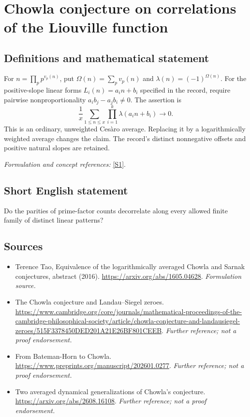\documentclass[11pt]{article}
\begin{document}
\section*{\texorpdfstring{Chowla conjecture on correlations of the Liouville function}{Chowla conjecture on correlations of the Liouville function}}\label{77}
\subsection{Definitions and mathematical statement}
For $n=\prod_p p^{v_p(n)}$, put $\Omega(n)=\sum_pv_p(n)$ and $\lambda(n)=(-1)^{\Omega(n)}$. For the positive-slope linear forms $L_i(n)=a_in+b_i$ specified in the record, require pairwise nonproportionality $a_ib_j-a_jb_i\ne0$. The assertion is
\[
 \frac1x\sum_{1\le n\le x}\prod_{i=1}^k\lambda(a_in+b_i)\longrightarrow0.
\]
This is an ordinary, unweighted Cesàro average. Replacing it by a logarithmically weighted average changes the claim. The record's distinct nonnegative offsets and positive natural slopes are retained.
\par\smallskip\textit{Formulation and concept references:} \href{https://arxiv.org/abs/1605.04628}{[S1]}.

\subsection{Short English statement}
Do the parities of prime-factor counts decorrelate along every allowed finite family of distinct linear patterns?
\subsection{Sources}
\begin{itemize}
\item[S1]Terence Tao, Equivalence of the logarithmically averaged Chowla and Sarnak conjectures, abstract (2016).
\url{https://arxiv.org/abs/1605.04628}.
\textit{Formulation source.}
\item[S2]The Chowla conjecture and Landau–Siegel zeroes.
\url{https://www.cambridge.org/core/journals/mathematical-proceedings-of-the-cambridge-philosophical-society/article/chowla-conjecture-and-landausiegel-zeroes/515F3378450DED201A21E26BF801CEEB}.
\textit{Further reference; not a proof endorsement.}
\item[S3]From Bateman-Horn to Chowla.
\url{https://www.preprints.org/manuscript/202601.0277}.
\textit{Further reference; not a proof endorsement.}
\item[S4]Two averaged dynamical generalizations of Chowla's conjecture.
\url{https://arxiv.org/abs/2608.16108}.
\textit{Further reference; not a proof endorsement.}
\end{itemize}
\end{document}
